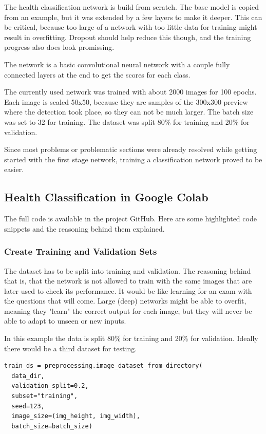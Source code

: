 \documentclass[a4paper,titlepage]{article}
\begin{document}
The health classification network is build from scratch.
The base model is copied from an example, but it was extended by a few layers to make it deeper.
This can be critical, because too large of a network with too little data for training might result in overfitting.
Dropout should help reduce this though, and the training progress also does look promissing.

The network is a basic convolutional neural network with a couple fully connected layers at the end to get the scores for each class.

The currently used network was trained with about 2000 images for 100 epochs.
Each image is scaled 50x50, because they are samples of the 300x300 preview where the detection took place, so they can not be much larger.
The batch size was set to 32 for training.
The dataset was split 80\% for training and 20\% for validation.

Since most problems or problematic sections were already resolved while getting started with the first stage network, training a classification network proved to be easier.

\subsection{Health Classification in Google Colab}

The full code is available in the project GitHub.
Here are some highlighted code snippets and the reasoning behind them explained.

\subsubsection{Create Training and Validation Sets}

The dataset has to be split into training and validation.
The reasoning behind that is, that the network is not allowed to train with the same images that are later used to check its performance.
It would be like learning for an exam with the questions that will come.
Large (deep) networks might be able to overfit, meaning they "learn" the correct output for each image, but they will never be able to adapt to unseen or new inputs.

In this example the data is split 80\% for training and 20\% for validation.
Ideally there would be a third dataset for testing.

\begin{lstlisting}
train_ds = preprocessing.image_dataset_from_directory(
  data_dir,
  validation_split=0.2,
  subset="training",
  seed=123,
  image_size=(img_height, img_width),
  batch_size=batch_size)
\end{lstlisting}
\end{document}
